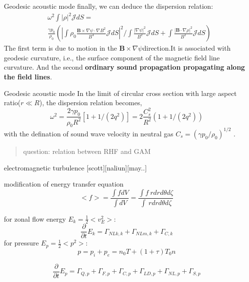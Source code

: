 \documentclass{beamer}
\begin{document}
\begin{frame}{Geodesic acoustic mode}
	finally, we can deduce the dispersion relation:
	\begin{equation}
	\begin{aligned}
		& \omega^2\int{|\rho|^2}\mathcal{J}dS= \\ 
		& \frac{\gamma{p_0}}{\rho_0}( |\int\rho_0\frac{\pmb{B}\times\nabla\psi\cdot\nabla{B^2}}{B^4}\mathcal{J}dS|^2/\int\frac{|\nabla\psi|^2}{B^2}\mathcal{J}dS + \int\frac{|\pmb{B}\cdot\nabla\rho|^2}{B^2}\mathcal{J}dS )
	\end{aligned}
	\end{equation}
	The first term is due to motion in the $\pmb{B}\times\nabla\psi$direction.It is associated with geodesic curvature, i.e., the surface component of the magnetic field line curvature. And the second \textbf{ordinary sound propagation propagating along the field lines}.
\end{frame}


\begin{frame}{Geodesic acoustic mode}
	In the limit of circular cross section with large aspect ratio($r\ll R$), the dispersion relation becomes,
	\begin{equation}
	\omega^2=\frac{2\gamma{p_0}}{\rho_0{R}^2}[1+1/(2q^2)]=2\frac{C_s^2}{R^2}(1+1/(2q^2))
	\end{equation}
	with the defination of sound wave velocity in neutral gas $C_s=(\gamma{p_0}/\rho_0)^{1/2}$ .
	
	\begin{quote}
		{\color{magenta} question: relation between RHF and GAM}
	\end{quote}

\end{frame}


\begin{frame}{electromagnetic turbulence}
	[scott][naliun][may..]
\end{frame}


\begin{frame}{modification of energy transfer equation}
	\begin{equation}
	<f>=\frac{\int{f}dV}{\int{dV}}
	=\frac{\int{f}\ rdrd\theta{d\zeta}}{\int\ rdrd\theta{d\zeta}}
	\end{equation}

	for zonal flow energy $E_k=\frac{1}{2}<v_E^2>$:
	\begin{equation}
	\frac{\partial}{\partial{t}}E_k=\Gamma_{NLk,k}+\Gamma_{NLm,k}+\Gamma_{C,k}
	\end{equation}
	for pressure $E_p=\frac{1}{2}<p^2>$:
	\begin{equation}
	p=p_i+p_e=n_0T+(1+\tau)T_0{n}
	\end{equation}
	
	\begin{equation}
	\frac{\partial}{\partial{t}}E_p=\Gamma_{Q,p}+\Gamma_{F,p}+\Gamma_{C,p}+\Gamma_{LD,p}+\Gamma_{NL,p}+\Gamma_{S,p}
	\end{equation}
\end{frame}
\end{document}
